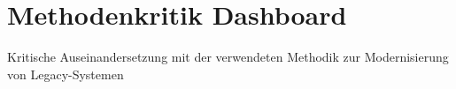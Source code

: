 \section{Methodenkritik Dashboard}
Kritische Auseinandersetzung mit der verwendeten Methodik zur Modernisierung von Legacy-Systemen